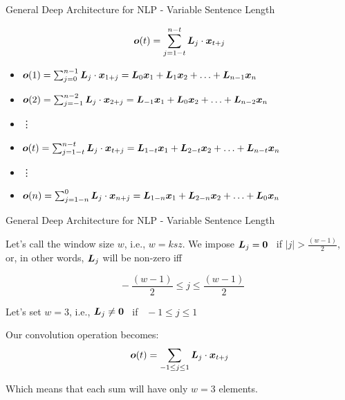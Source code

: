 \documentclass[handout]{beamer} %
\begin{document}
  \begin{frame}{General Deep Architecture for NLP - Variable Sentence Length}
      \begin{centering}
          \vspace{-1.8cm}
          $${\bm{o}}(t)=\sum_{j=1-t}^{n-t}{{\bm{L}}_j \cdot {\bm{x}}_{t+j}}$$
          \vspace{-0.5cm}
          \begin{itemize}[<+->]
              \item[] ${\bm{o}}(1)=\sum_{j=0}^{n-1}{{\bm{L}}_j\cdot{\bm{x}}_{1+j}}={\bm{L}}_0{\bm{x}}_1+{\bm{L}}_1{\bm{x}}_2+\ldots+{\bm{L}}_{n-1}{\bm{x}}_n$
              \item[] ${\bm{o}}(2)=\sum_{j=-1}^{n-2}{{\bm{L}}_j\cdot{\bm{x}}_{2+j}}={\bm{L}}_{-1}{\bm{x}}_1+{\bm{L}}_0{\bm{x}}_2+\ldots+{\bm{L}}_{n-2}{\bm{x}}_n$
              \item[] \hspace{5cm}\vdots
              \item[] ${\bm{o}}(t)=\sum_{j=1-t}^{n-t}{{\bm{L}}_j\cdot{\bm{x}}_{t+j}}={\bm{L}}_{1-t}{\bm{x}}_1+{\bm{L}}_{2-t}{\bm{x}}_2+\ldots+{\bm{L}}_{n-t}{\bm{x}}_n$
              \item[] \hspace{5cm}\vdots
              \item[] ${\bm{o}}(n)=\sum_{j=1-n}^{0}{{\bm{L}}_j\cdot{\bm{x}}_{n+j}}={\bm{L}}_{1-n}{\bm{x}}_1+{\bm{L}}_{2-n}{\bm{x}}_2+\ldots+{\bm{L}}_{0}{\bm{x}}_n$

      \end{itemize}
          
      \end{centering}

  \end{frame}

  \begin{frame}{General Deep Architecture for NLP - Variable Sentence Length}

    Let's call the window size $w$, i.e., $w=ksz$. We impose
    ${\bm{L}}_j=\bm{0}\enspace$ if $|j|>\frac{(w-1)}{2}$, or, in other words, ${\bm{L}}_j$
    will be non-zero iff
    
    $$\enspace-\frac{(w-1)}{2} \leq j \leq \frac{(w-1)}{2}$$

    \pause Let's set $w=3$, i.e., ${\bm{L}}_j\neq\bm{0}\enspace$
    if $\enspace-1 \leq j \leq 1$

    \pause Our convolution operation becomes:
    $${\bm{o}}(t)=\sum_{-1 \leq j \leq 1}{{\bm{L}}_j \cdot {\bm{x}}_{t+j}}$$

    \pause Which means that each sum will have only $w=3$ elements.

  \end{frame}
\end{document}
